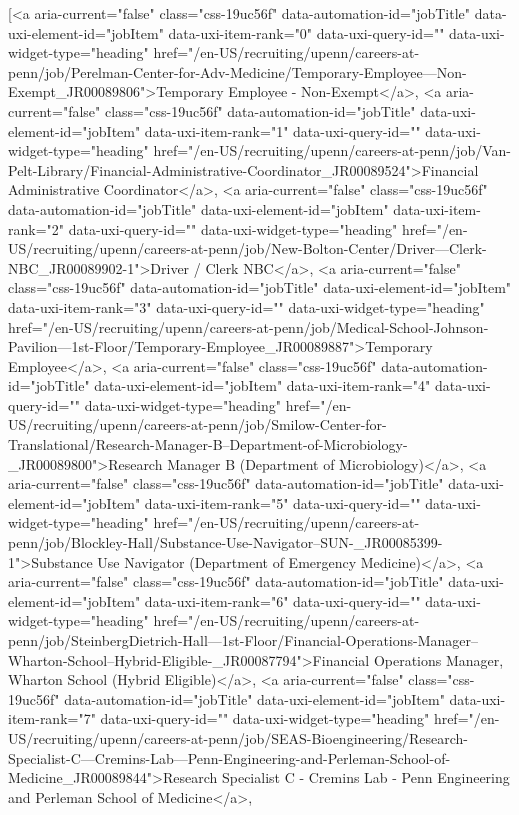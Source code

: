 [<a aria-current="false" class="css-19uc56f" data-automation-id="jobTitle" data-uxi-element-id="jobItem" data-uxi-item-rank="0" data-uxi-query-id="" data-uxi-widget-type="heading" href="/en-US/recruiting/upenn/careers-at-penn/job/Perelman-Center-for-Adv-Medicine/Temporary-Employee---Non-Exempt_JR00089806">Temporary Employee - Non-Exempt</a>, 
<a aria-current="false" class="css-19uc56f" data-automation-id="jobTitle" data-uxi-element-id="jobItem" data-uxi-item-rank="1" data-uxi-query-id="" data-uxi-widget-type="heading" href="/en-US/recruiting/upenn/careers-at-penn/job/Van-Pelt-Library/Financial-Administrative-Coordinator_JR00089524">Financial Administrative Coordinator</a>, 
<a aria-current="false" class="css-19uc56f" data-automation-id="jobTitle" data-uxi-element-id="jobItem" data-uxi-item-rank="2" data-uxi-query-id="" data-uxi-widget-type="heading" href="/en-US/recruiting/upenn/careers-at-penn/job/New-Bolton-Center/Driver---Clerk-NBC_JR00089902-1">Driver / Clerk NBC</a>, 
<a aria-current="false" class="css-19uc56f" data-automation-id="jobTitle" data-uxi-element-id="jobItem" data-uxi-item-rank="3" data-uxi-query-id="" data-uxi-widget-type="heading" href="/en-US/recruiting/upenn/careers-at-penn/job/Medical-School-Johnson-Pavilion---1st-Floor/Temporary-Employee_JR00089887">Temporary Employee</a>, 
<a aria-current="false" class="css-19uc56f" data-automation-id="jobTitle" data-uxi-element-id="jobItem" data-uxi-item-rank="4" data-uxi-query-id="" data-uxi-widget-type="heading" href="/en-US/recruiting/upenn/careers-at-penn/job/Smilow-Center-for-Translational/Research-Manager-B--Department-of-Microbiology-_JR00089800">Research Manager B (Department of Microbiology)</a>, 
<a aria-current="false" class="css-19uc56f" data-automation-id="jobTitle" data-uxi-element-id="jobItem" data-uxi-item-rank="5" data-uxi-query-id="" data-uxi-widget-type="heading" href="/en-US/recruiting/upenn/careers-at-penn/job/Blockley-Hall/Substance-Use-Navigator--SUN-_JR00085399-1">Substance Use Navigator (Department of Emergency Medicine)</a>, 
<a aria-current="false" class="css-19uc56f" data-automation-id="jobTitle" data-uxi-element-id="jobItem" data-uxi-item-rank="6" data-uxi-query-id="" data-uxi-widget-type="heading" href="/en-US/recruiting/upenn/careers-at-penn/job/SteinbergDietrich-Hall---1st-Floor/Financial-Operations-Manager--Wharton-School--Hybrid-Eligible-_JR00087794">Financial Operations Manager, Wharton School (Hybrid Eligible)</a>, 
<a aria-current="false" class="css-19uc56f" data-automation-id="jobTitle" data-uxi-element-id="jobItem" data-uxi-item-rank="7" data-uxi-query-id="" data-uxi-widget-type="heading" href="/en-US/recruiting/upenn/careers-at-penn/job/SEAS-Bioengineering/Research-Specialist-C---Cremins-Lab---Penn-Engineering-and-Perleman-School-of-Medicine_JR00089844">Research Specialist C - Cremins Lab - Penn Engineering and Perleman School of Medicine</a>, 
